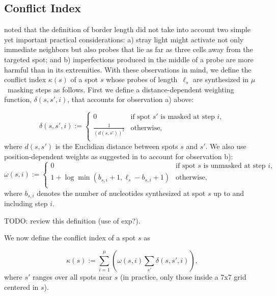 \documentclass{bioinfo}
\begin{document}
\subsection{Conflict Index}

\citep{KAHNG03_1} noted that the definition of border length did not take into account two simple yet important practical considerations: a) stray light might activate not only immediate neighbors but also probes that lie as far as three cells away from the targeted spot; and b) imperfections produced in the middle of a probe are more harmful than in its extremities. With these observations in mind, we define the conflict index $\kappa(s)$ of a spot $s$ whose probes of length~$\ell_{s}$ are synthesized in $\mu$~masking steps as follows. First we define a distance-dependent weighting function, $\delta(s,s',i)$, that accounts for observation a) above:

\begin{equation}
\label{eq:dist_weight} \delta(s,s',i) :=
        \left\{
                \begin{array}{ll}
                        0 & \mbox{if spot $s'$ is masked at step $i$}, \\
                        \frac{1}{(d(s,s'))^{2}} & \mbox{otherwise}, \\
                \end{array}
        \right.
\end{equation}
where $d(s,s')$ is the Euclidian distance between spots $s$ and $s'$. We also use position-dependent weights as suggested in \citealp{KAHNG03_1} to account for observation b):
\begin{equation}
\label{eq:pos_mult} \omega(s,i) :=
        \left\{
                \begin{array}{ll}
                        0 & \mbox{if spot $s$ is unmasked at step $i$}, \\
                        1 + \log{\min(b_{s,i} + 1,\ell_{s} - b_{s,i} + 1)} & \mbox{otherwise}, \\
                \end{array}
        \right.
\end{equation}
where $b_{s,i}$ denotes the number of nucleotides synthesized at spot $s$ up to and including step $i$.

TODO: review this definition (use of exp?).

We now define the conflict index of a spot $s$ as

\begin{equation}
\label{eq:conf_idx} \kappa(s) := \sum_{i=1}^{\mu} \left( \omega(s,i) \sum_{s'} \delta(s,s',i) \right),
\end{equation}
where $s'$ ranges over all spots near $s$ (in practice, only those inside a 7x7 grid centered in $s$).
\end{document}
